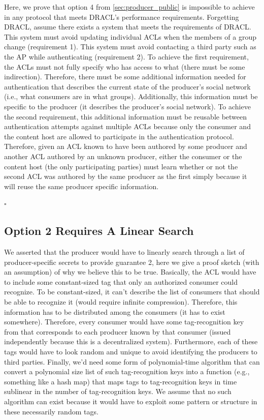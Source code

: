 \documentclass[pdftex,12pt,a4papaer,twoside,notitlepage]{report}
\begin{document}
\begin{appendices}
Here, we prove that option 4 from \cref{sec:producer_public} is impossible to
achieve in any protocol that meets DRACL's performance requirements. Forgetting
DRACL, assume there exists a system that meets the requirements of DRACL. This
system must avoid updating individual ACLs when the members of a group change
(requirement 1). This system must avoid contacting a third party such as the AP
while authenticating (requirement 2). To achieve the first requirement, the ACLs
must not fully specify who has access to what (there must be some indirection).
Therefore, there must be some additional information needed for authentication
that describes the current state of the producer's social network (i.e., what
consumers are in what groups). Additionally, this information must be specific
to the producer (it describes the producer's social network). To achieve the
second requirement, this additional information must be reusable between
authentication attempts against multiple ACLs because only the consumer and the
content host are allowed to participate in the authentication protocol.
Therefore, given an ACL known to have been authored by some producer and another
ACL authored by an unknown producer, either the consumer or the content host
(the only participating parties) must learn whether or not the second ACL was
authored by the same producer as the first simply because it will reuse the same
producer specific information.

{\hfill $\square$}

\subsection{Option 2 Requires A Linear Search}
\label{proof:public-producer-2}

We asserted that the producer would have to linearly search through a list of
producer-specific secrets to provide guarantee 2, here we give a proof sketch
(with an assumption) of why we believe this to be true. Basically, the ACL would
have to include some constant-sized tag that only an authorized consumer could
recognize. To be constant-sized, it can't describe the list of consumers that
should be able to recognize it (would require infinite compression). Therefore,
this information has to be distributed among the consumers (it has to exist
somewhere). Therefore, every consumer would have some tag-recognition key from
that corresponds to each producer known by that consumer (issued independently
because this is a decentralized system). Furthermore, each of these tags would
have to look random and unique to avoid identifying the producers to third
parties. Finally, we'd need some form of polynomial-time algorithm that can
convert a polynomial size list of such tag-recognition keys into a function
(e.g., something like a hash map) that maps tags to tag-recognition keys in time
sublinear in the number of tag-recognition keys. We assume that no such
algorithm can exist because it would have to exploit some pattern or structure
in these necessarily random tags.


\end{appendices}
\end{document}
